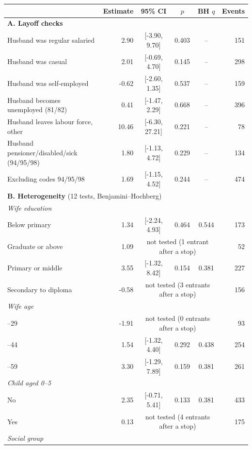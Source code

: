 \begin{tabular}{lrcccr}
\toprule
 & Estimate & 95\% CI & $p$ & BH $q$ & Events \\
\midrule
\multicolumn{6}{l}{\textbf{A. Layoff checks}} \\
\quad Husband was regular salaried & 2.90 & [-3.90, 9.70] & 0.403 & -- & 151 \\
\quad Husband was casual & 2.01 & [-0.69, 4.70] & 0.145 & -- & 298 \\
\quad Husband was self-employed & -0.62 & [-2.60, 1.35] & 0.537 & -- & 159 \\
\quad Husband becomes unemployed (81/82) & 0.41 & [-1.47, 2.29] & 0.668 & -- & 396 \\
\quad Husband leaves labour force, other & 10.46 & [-6.30, 27.21] & 0.221 & -- & 78 \\
\quad Husband pensioner/disabled/sick (94/95/98) & 1.80 & [-1.13, 4.72] & 0.229 & -- & 134 \\
\quad Excluding codes 94/95/98 & 1.69 & [-1.15, 4.52] & 0.244 & -- & 474 \\
\midrule
\multicolumn{6}{l}{\textbf{B. Heterogeneity} (12 tests, Benjamini--Hochberg)} \\
\multicolumn{6}{l}{\textit{Wife education}} \\
\quad Below primary & 1.34 & [-2.24, 4.93] & 0.464 & 0.544 & 173 \\
\quad Graduate or above & 1.09 & \multicolumn{3}{c}{not tested (1 entrant after a stop)} & 52 \\
\quad Primary or middle & 3.55 & [-1.32, 8.42] & 0.154 & 0.381 & 227 \\
\quad Secondary to diploma & -0.58 & \multicolumn{3}{c}{not tested (3 entrants after a stop)} & 156 \\
\multicolumn{6}{l}{\textit{Wife age}} \\
\quad 18--29 & -1.91 & \multicolumn{3}{c}{not tested (0 entrants after a stop)} & 93 \\
\quad 30--44 & 1.54 & [-1.32, 4.40] & 0.292 & 0.438 & 254 \\
\quad 45--59 & 3.30 & [-1.29, 7.89] & 0.159 & 0.381 & 261 \\
\multicolumn{6}{l}{\textit{Child aged 0--5}} \\
\quad No & 2.35 & [-0.71, 5.41] & 0.133 & 0.381 & 433 \\
\quad Yes & 0.13 & \multicolumn{3}{c}{not tested (4 entrants after a stop)} & 175 \\
\multicolumn{6}{l}{\textit{Social group}} \\

\end{tabular}
